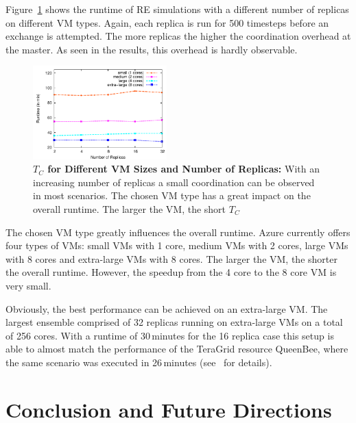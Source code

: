 \documentclass[conference,final]{IEEEtran}
\newcommand{\up}{\vspace*{-1em}}
\newcommand{\tc}{$T_{C}$ }
\begin{document}
Figure~\ref{fig:performance_repex_scaleout_vmsizes} shows the runtime
of RE simulations with a different number of replicas on different VM
types. Again, each replica is run for 500 timesteps before an exchange
is attempted. The more replicas the higher the coordination overhead
at the master. As seen in the results, this overhead is hardly
observable.
\begin{figure}[ht]
    \centering
        \includegraphics[width=0.46\textwidth]{performance/repex-azure.pdf}
    \caption{\textbf{\tc for Different VM Sizes and Number of Replicas:} With
    an increasing number of replicas a small coordination can be observed in most 
    scenarios. The chosen VM type has a great impact on the overall runtime. The larger
    the VM, the short \tc}
    \label{fig:performance_repex_scaleout_vmsizes}
\end{figure}

The chosen VM type greatly influences the overall runtime. Azure currently offers four
types of VMs: small VMs with 1 core, medium VMs with 2 cores, large VMs with 8 cores
and extra-large VMs with 8 cores. The larger the VM, the shorter the overall runtime.
However, the speedup from the 4 core to the 8 core VM is very small. 

Obviously, the best performance can be achieved on an extra-large
VM. The largest ensemble comprised of 32 replicas running on
extra-large VMs on a total of 256 cores.  With a runtime of
30\,minutes for the 16 replica case this setup is able to almost match
the performance of the TeraGrid resource QueenBee, where the same
scenario was executed in 26\,minutes (see~\cite{repex_ptrs} for
details).


\section{Conclusion and Future Directions}
\up
\end{document}
